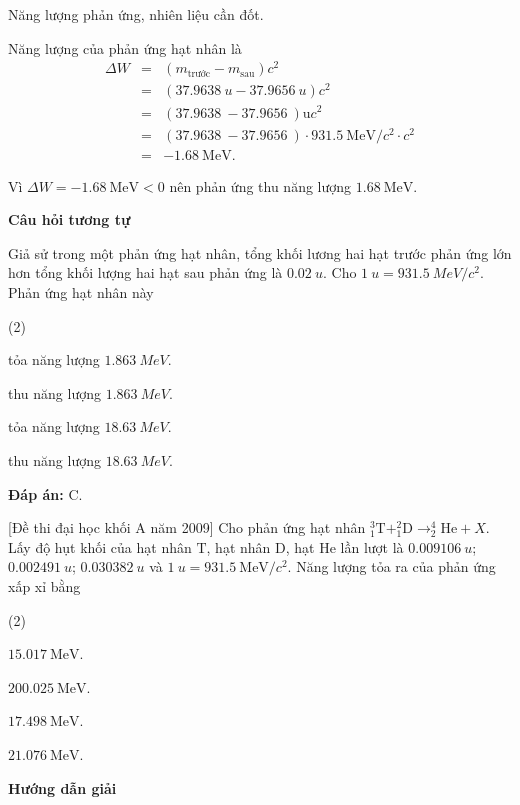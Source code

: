 \begin{dang}{Năng lượng phản ứng, nhiên liệu cần đốt.}
{		Năng lượng của phản ứng hạt nhân là
		\begin{eqnarray*}
			\Delta W &=& \left(m_\text{trước} - m_\text{sau}\right) c^2 \\
			&=& \left(\SI{37,9638}{u} - \SI{37,9656}{u}\right) c^2\\
			&=&\left(\SI{37,9638}{} - \SI{37,9656}{}\right) \text{u}c^2\\
			&=&\left(\SI{37,9638}{} - \SI{37,9656}{}\right) \cdot\SI{931,5}{\mega\electronvolt/c^2}\cdot c^2\\
			&=&-\SI{1,68}{\mega\electronvolt}.
		\end{eqnarray*}
		
		Vì $\Delta W = -\SI{1,68}{\mega\electronvolt} < 0$ nên phản ứng thu năng lượng $\SI{1,68}{\mega\electronvolt}$.
		
		\begin{center}
			\textbf{Câu hỏi tương tự}
		\end{center}
		
		Giả sử trong một phản ứng hạt nhân, tổng khối lương hai hạt trước phản ứng lớn hơn tổng khối lượng hai hạt sau phản ứng là $\SI{0.02}{u}$. Cho $\SI{1}{u} = \SI{931.5}{MeV/c^2}$. Phản ứng hạt nhân này
		\begin{mcq}(2)
			\item tỏa năng lượng $\SI{1.863}{MeV}$.
			\item thu năng lượng $\SI{1.863}{MeV}$.
			\item tỏa năng lượng $\SI{18.63}{MeV}$.
			\item thu năng lượng $\SI{18.63}{MeV}$.
		\end{mcq}
		
		\textbf{Đáp án:} C.
	}
	{
		[Đề thi đại học khối A năm 2009] Cho phản ứng hạt nhân $^3_1\text{T} + ^2_1 \text{D} \rightarrow ^4_2\text{He} + X$. Lấy độ hụt khối của hạt nhân $\text{T}$, hạt nhân $\text{D}$, hạt $\text{He}$ lần lượt là $\SI{0,009106}{u}$; $\SI{0,002491}{u}$; $\SI{0,030382}{u}$ và $\SI{1}{u}=\SI{931,5}{\mega\electronvolt/c^2}$. Năng lượng tỏa ra của phản ứng xấp xỉ bằng
		
		\begin{mcq}(2)
			\item $\SI{15,017}{\mega\electronvolt}$.
			\item $\SI{200,025}{\mega\electronvolt}$.
			\item $\SI{17,498}{\mega\electronvolt}$.
			\item $\SI{21,076}{\mega\electronvolt}$.
		\end{mcq}
	}
	{\begin{center}
			\textbf{Hướng dẫn giải}
		\end{center}
		
}
\end{dang}
